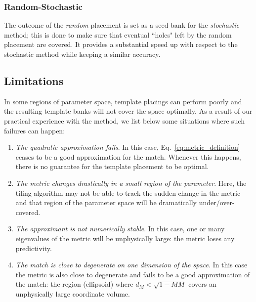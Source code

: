 \documentclass[twocolumn,showpacs,preprintnumbers,nofootinbib,prd,
superscriptaddress,10pt]{revtex4-2}
\begin{document}
\subsubsection{Random-Stochastic}\label{par:randomstochastic}
The outcome of the {\it random} placement is set as a seed bank for the {\it stochastic} method; this is done to make sure that eventual ``holes" left by the random placement are covered. It provides a substantial speed up with respect to the stochastic method while keeping a similar accuracy.


\subsection{Limitations} \label{sec:limitations}

In some regions of parameter space, template placings can perform poorly and the resulting template banks will not cover the space optimally.
As a result of our practical experience with the method, we list below some situations where such failures can happen:

\begin{enumerate}
	\item {\it The quadratic approximation fails}. In this case, Eq.~\eqref{eq:metric_definition} ceases to be a good approximation for the match. Whenever this happens, there is no guarantee for the template placement to be optimal.
	\item {\it The metric changes drastically in a small region of the parameter}. Here, the tiling algorithm may not be able to track the sudden change in the metric and that region of the parameter space will be dramatically under/over-covered.
	\item {\it The approximant is not numerically stable}. In this case, one or many eigenvalues of the metric will be unphysically large: the metric loses any predictivity.
	\item {\it The match is close to degenerate on one dimension of the space}. In this case the metric is also close to degenerate and fails to be a good approximation of the match: the region (ellipsoid) where $d_M<\sqrt{1-MM}$ covers an unphysically large coordinate volume.
\end{enumerate}
\end{document}
